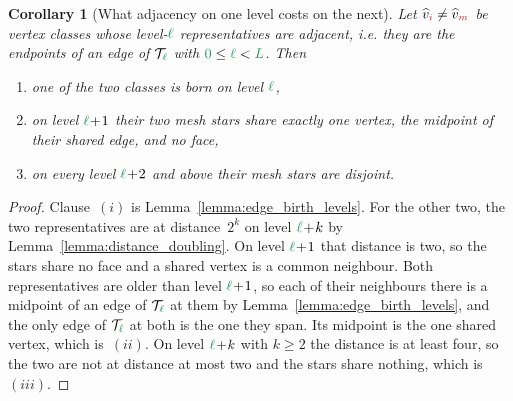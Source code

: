 \documentclass[a4paper, 12pt]{article}
\newcommand{\green}{\color{ForestGreen}}
\newcommand{\brickred}{\color{BrickRed}}
\newcommand{\T}{\mathcal{T}}
\newcommand{\vertexClass}[1]{\widehat{v}_{#1}}
\newcommand{\coarseIdxone}{{\brickred i}}
\newcommand{\coarseIdxtwo}{{\brickred m}}
\renewcommand{\l}{{\green\ell}}
\renewcommand{\L}{{\green L}}
\newcommand{\lzero}{{\green 0}}
\newtheorem{corollary}[theorem]{Corollary}
\theoremstyle{definition}
\theoremstyle{plain}
\numberwithin{equation}{section}
\begin{document}
\begin{corollary}[What adjacency on one level costs on the next]
    \label{cor:adjacent_classes}
    Let $\vertexClass{\coarseIdxone} \neq \vertexClass{\coarseIdxtwo}$ be vertex classes whose level-$\l$ representatives are adjacent, i.e. they are the endpoints of an edge of $\T_\l$ with $\lzero \leq \l < \L$. Then
    \begin{enumerate}[topsep=3pt, itemsep=-2pt]
        \item[$(i)$] one of the two classes is born on level $\l$,
        \item[$(ii)$] on level $\l \! + \! 1$ their two mesh stars share exactly one vertex, the midpoint of their shared edge, and no face,
        \item[$(iii)$] on every level $\l \! + \! 2$ and above their mesh stars are disjoint.
    \end{enumerate}
\end{corollary}
\begin{proof}
    Clause~$(i)$ is Lemma~\ref{lemma:edge_birth_levels}. For the other two, the two representatives are at distance~$2^k$ on level $\l \! + \! k$ by Lemma~\ref{lemma:distance_doubling}. On level $\l \! + \! 1$ that distance is two, so the stars share no face and a shared vertex is a common neighbour. Both representatives are older than level $\l \! + \! 1$, so each of their neighbours there is a midpoint of an edge of $\T_\l$ at them by Lemma~\ref{lemma:edge_birth_levels}, and the only edge of $\T_\l$ at both is the one they span. Its midpoint is the one shared vertex, which is~$(ii)$. On level $\l \! + \! k$ with $k \geq 2$ the distance is at least four, so the two are not at distance at most two and the stars share nothing, which is~$(iii)$.
\end{proof}
\end{document}
